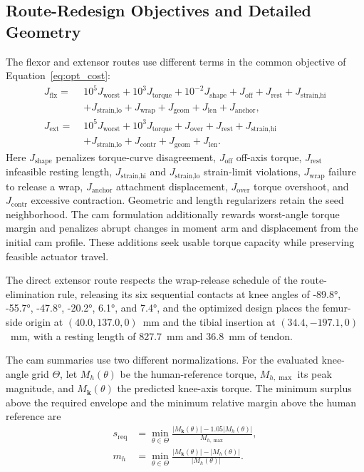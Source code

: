 \documentclass[utf8]{frontiers_suppmat} %
\begin{document}
\subsection{Route-Redesign Objectives and Detailed Geometry}\label{app:route_redesign_details}

The flexor and extensor routes use different terms in the common objective of Equation~\eqref{eq:opt_cost}:
\begin{align}
J_{\mathrm{flx}} =\;& 10^{5}J_{\text{worst}} + 10^{3}J_{\text{torque}} + 10^{-2}J_{\text{shape}} + J_{\text{off}} + J_{\text{rest}} + J_{\text{strain,hi}} \nonumber\\
& + J_{\text{strain,lo}} + J_{\text{wrap}} + J_{\text{geom}} + J_{\text{len}} + J_{\text{anchor}},
\label{eq:opt_cost_flx}\\[4pt]
J_{\mathrm{ext}} =\;& 10^{5}J_{\text{worst}} + 10^{3}J_{\text{torque}} + J_{\text{over}} + J_{\text{rest}} + J_{\text{strain,hi}} \nonumber\\
& + J_{\text{strain,lo}} + J_{\text{contr}} + J_{\text{geom}} + J_{\text{len}}.
\label{eq:opt_cost_ext}
\end{align}
Here $J_{\text{shape}}$ penalizes torque-curve disagreement, $J_{\text{off}}$ off-axis torque, $J_{\text{rest}}$ infeasible resting length, $J_{\text{strain,hi}}$ and $J_{\text{strain,lo}}$ strain-limit violations, $J_{\text{wrap}}$ failure to release a wrap, $J_{\text{anchor}}$ attachment displacement, $J_{\text{over}}$ torque overshoot, and $J_{\text{contr}}$ excessive contraction. Geometric and length regularizers retain the seed neighborhood. The cam formulation additionally rewards worst-angle torque margin and penalizes abrupt changes in moment arm and displacement from the initial cam profile. These additions seek usable torque capacity while preserving feasible actuator travel.

The direct extensor route respects the wrap-release schedule of the route-elimination rule, releasing its six sequential contacts at knee angles of \ang{-89.8}, \ang{-55.7}, \ang{-47.8}, \ang{-20.2}, \ang{6.1}, and \ang{7.4}, and the optimized design places the femur-side origin at $(40.0, 137.0, 0)$~mm and the tibial insertion at $(34.4, -197.1, 0)$~mm, with a resting length of \qty{827.7}{\mm} and \qty{36.8}{\mm} of tendon.

The cam summaries use two different normalizations. For the evaluated knee-angle grid $\Theta$, let $M_h(\theta)$ be the human-reference torque, $M_{h,\max}$ its peak magnitude, and $M_{\mathbf{k}}(\theta)$ the predicted knee-axis torque. The minimum surplus above the required envelope and the minimum relative margin above the human reference are
\begin{equation}
\begin{aligned}
s_{\mathrm{req}} &= \min_{\theta\in\Theta}\frac{\lvert M_{\mathbf{k}}(\theta)\rvert-1.05\lvert M_h(\theta)\rvert}{M_{h,\max}},\\
m_h &= \min_{\theta\in\Theta}\frac{\lvert M_{\mathbf{k}}(\theta)\rvert-\lvert M_h(\theta)\rvert}{\lvert M_h(\theta)\rvert}.
\end{aligned}
\label{eq:cam_summary_definitions}
\end{equation}
\end{document}
